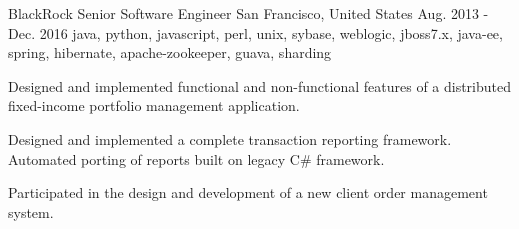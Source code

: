 \cventry
    {BlackRock} %
    {Senior Software Engineer} %
    {San Francisco, United States} %
    {Aug. 2013 - Dec. 2016} %
    {java, python, javascript, perl, unix, sybase, weblogic, jboss7.x, java-ee, spring, hibernate, apache-zookeeper, guava, sharding}%
    {
    \begin{cvitems} %
        \item { Designed and implemented functional and non-functional features of a distributed fixed-income portfolio management application. }
        \item { Designed and implemented a complete transaction reporting framework. Automated porting of reports built on legacy C\# framework. }
        \item { Participated in the design and development of a new client order management system. }
    \end{cvitems}
    }